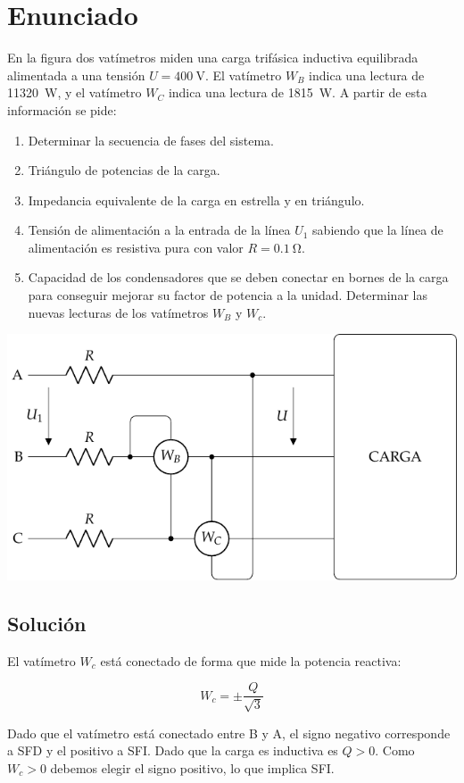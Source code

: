 \section{Enunciado}

En la figura dos vatímetros miden una carga trifásica inductiva
equilibrada alimentada a una tensión $U = \SI{400}{\volt}$. El
vatímetro $W_B$ indica una lectura de \SI{11320}{\watt}, y el
vatímetro $W_C$ indica una lectura de \SI{1815}{\watt}. A partir de
esta información se pide:

\begin{enumerate}
\item Determinar la secuencia de fases del sistema.
\item Triángulo de potencias de la carga.
\item Impedancia equivalente de la carga en estrella y
  en triángulo.
\item Tensión de alimentación a la entrada de la línea
  $U_1$ sabiendo que la línea de alimentación es resistiva pura con
  valor $R = \SI{0.1}{\ohm}$.
\item Capacidad de los condensadores que se deben
  conectar en bornes de la carga para conseguir mejorar su factor de
  potencia a la unidad. Determinar las nuevas lecturas de los
  vatímetros $W_B$ y $W_c$.
\end{enumerate}

\begin{center}
  \includegraphics[width=0.6\linewidth]{figuras/BT3_10.pdf}
\end{center}

\subsection*{Solución}

El vatímetro $W_c$ está conectado de forma que mide la potencia
reactiva:

\[
  W_c = \pm \frac{Q}{\sqrt{3}}
\]

Dado que el vatímetro está conectado entre B y A, el signo negativo
corresponde a SFD y el positivo a SFI. Dado que la carga es inductiva
es $Q > 0$. Como $W_c > 0$ debemos elegir el signo positivo, lo que
implica SFI.

